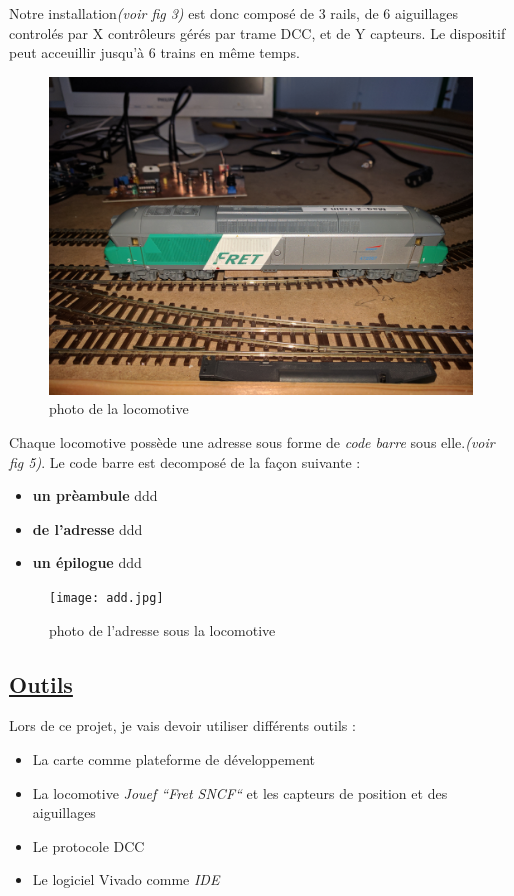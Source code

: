 \newpage

  Notre installation\emph{(voir fig 3)} est donc compos\'e de 3 rails, de 6 aiguillages
control\'es par X contr\^oleurs gérés par trame DCC, et de Y capteurs.
Le dispositif peut acceuillir jusqu'\`a 6 trains en m\^eme temps.

\begin{figure}[ht]
\centering
\includegraphics[scale=0.03]{loco.jpg}
\caption{photo de la locomotive}
\label{fig4}
\end{figure}

  Chaque locomotive poss\`ede une adresse sous forme de \emph{code
  barre} sous elle.\emph{(voir fig 5)}.
Le code barre est decompos\'e de la façon suivante :
\begin{itemize}
    \item \textbf{un pr\`eambule} ddd 
    \item \textbf{de l'adresse} ddd
    \item \textbf{un  \'epilogue} ddd
\end{itemize}

\begin{figure}[ht]
\centering
\texttt{[image: add.jpg]}
\caption{photo de l'adresse sous la locomotive}
\label{fig5}
\end{figure}

\newpage


\subsection{\underline{ Outils}}
\label{sec:outils}

Lors de ce projet, je vais devoir utiliser diff\'erents outils :
\begin{itemize}
  \item La carte \crt comme plateforme de d\'eveloppement
  \item La locomotive \emph{Jouef ``Fret SNCF``}\cite{Jouef}  et les capteurs de
    position et des aiguillages
  \item Le protocole DCC \cite{DCC}
  \item Le logiciel Vivado comme \emph{IDE}
\end{itemize}

